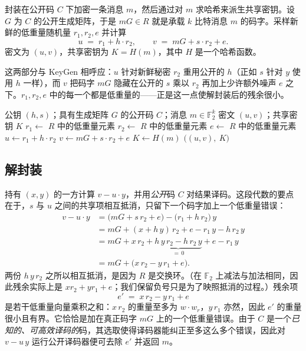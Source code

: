 封装在公开码 $C$ 下加密一条消息 $m$，然后通过对 $m$ 求哈希来派生共享密钥。设 $G$ 为 $C$ 的公开生成矩阵，于是 $mG \in R$ 就是承载 $k$ 比特消息 $m$ 的码字。采样新鲜的低重量随机量 $r_1, r_2, e$ 并计算
\[
u \;=\; r_1 + h\cdot r_2, \qquad
v \;=\; mG + s\cdot r_2 + e .
\]
密文为 $(u, v)$，共享密钥为 $K = H(m)$，其中 $H$ 是一个哈希函数。

这两部分与 KeyGen 相呼应：$u$ 针对新鲜秘密 $r_2$ 重用公开的 $h$（正如 $s$ 针对 $y$ 使用 $h$ 一样），而 $v$ 把码字 $mG$ 隐藏在公开的 $s$ 乘以 $r_2$ 再加上少许额外噪声 $e$ 之下。$r_1, r_2, e$ 中的每一个都是低重量的——正是这一点使解封装后的残余很小。

\begin{algorithm}[H]
\caption{HQC Encapsulate（教学形式）}
\label{alg:hqc-encaps}
\begin{algorithmic}[1]
\Require 公钥 $(h,s)$；具有生成矩阵 $G$ 的公开码 $C$；消息 $m\in\mathbb{F}_2^{k}$
\Ensure 密文 $(u,v)$；共享密钥 $K$
\State $r_1 \gets$ $R$ 中的低重量元素 
\State $r_2 \gets$ $R$ 中的低重量元素 
\State $e \gets$ $R$ 中的低重量元素 
\State $u \gets r_1 + h\cdot r_2$
\State $v \gets mG + s\cdot r_2 + e$ 
\State $K \gets H(m)$ 
\State \Return $\big((u,v),\ K\big)$
\end{algorithmic}
\end{algorithm}

\subsection{解封装}

持有 $(x, y)$ 的一方计算 $v - u\cdot y$，并用\emph{公开}码 $C$ 对结果译码。这段代数的要点在于，$s$ 与 $u$ 之间的共享项相互抵消，只留下一个码字加上一个低重量错误：
\[
\begin{aligned}
v - u\cdot y
  &= \big(mG + s\,r_2 + e\big) - \big(r_1 + h\,r_2\big)\,y \\[2pt]
  &= mG + (x + h\,y)\,r_2 + e - r_1\,y - h\,r_2\,y \\[2pt]
  &= mG + x\,r_2 + \underbrace{h\,y\,r_2 - h\,r_2\,y}_{=\,0} + e - r_1\,y \\[2pt]
  &= mG + \big(x\,r_2 - y\,r_1 + e\big).
\end{aligned}
\]
两份 $h\,y\,r_2$ 之所以相互抵消，是因为 $R$ 是交换环。（在 $\mathbb{F}_2$ 上减法与加法相同，因此残余实际上是 $x r_2 + y r_1 + e$；我们保留负号只是为了映照抵消的过程。）残余项
\[
e' \;=\; x\,r_2 - y\,r_1 + e
\]
是若干低重量向量乘积之和：$x\,r_2$ 的重量至多为 $w\cdot w_r$，$y\,r_1$ 亦然，因此 $e'$ 的重量很小且有界。它恰恰是加在真正码字 $mG$ 上的一个低重量错误。由于 $C$ 是一个\emph{已知的、可高效译码的}码，其选取使得译码器能纠正至多这么多个错误，因此对 $v - u\,y$ 运行公开译码器便可去除 $e'$ 并返回 $m$。

